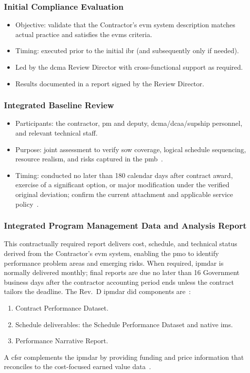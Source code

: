 \documentclass[../main.tex]{subfiles}
\begin{document}
\subsubsection{Initial Compliance Evaluation}
\begin{itemize}
  \item Objective: validate that the Contractor's \ac{evm} system description matches actual practice and satisfies the \ac{evms} criteria.
  \item Timing: executed prior to the initial \ac{ibr} (and subsequently only if needed).
  \item Led by the \ac{dcma} Review Director with cross-functional support as required.
  \item Results documented in a report signed by the Review Director.
\end{itemize}
\subsubsection{Integrated Baseline Review}
\begin{itemize}
  \item Participants: the contractor, \ac{pm} and deputy, \ac{dcma}/\ac{dcaa}/\ac{supship} personnel, and relevant technical staff.
  \item Purpose: joint assessment to verify \ac{sow} coverage, logical schedule sequencing, resource realism, and risks captured in the \ac{pmb}~\autocite{DoD-IPM-EVM-Definitions-2026}.
  \item Timing: conducted no later than 180 calendar days after contract award, exercise of a significant option, or major modification under the verified original deviation; confirm the current attachment and applicable service policy~\autocite{edo-3-6-1-evm-intro-2025,DFARS-EVMS-Deviation-2026,DoD-IPM-Policy-Guidance-2026}.
\end{itemize}
\subsubsection{Integrated Program Management Data and Analysis Report}
This contractually required report delivers cost, schedule, and technical status derived from the Contractor's \ac{evm}
system, enabling the \ac{pmo} to identify performance problem areas and emerging risks. When required, \ac{ipmdar} is
normally delivered monthly; final reports are due no later than 16 Government business days after the contractor
accounting period ends unless the contract tailors the deadline. The Rev.~D \ac{ipmdar} \ac{did} components
are~\autocite{IPMDAR-DID-RevD-2026,DoD-IPM-Policy-Guidance-2026,DoD-IPM-EVM-Definitions-2026}:
\begin{enumerate}
  \item Contract Performance Dataset.
  \item Schedule deliverables: the Schedule Performance Dataset and native \ac{ims}.
  \item Performance Narrative Report.
\end{enumerate}
A \ac{cfsr} complements the \ac{ipmdar} by providing funding and price information that reconciles to the cost-focused
earned value data~\autocite{edo-3-6-1-evm-intro-2025,DoD-IPM-EVM-Definitions-2026}.
\end{document}
